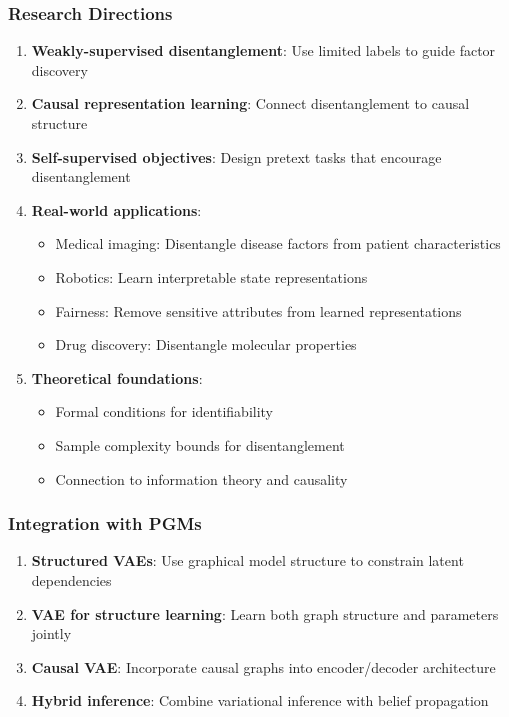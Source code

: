 \documentclass[conference]{IEEEtran}
\begin{document}
\subsubsection{Research Directions}

\begin{enumerate}
    \item \textbf{Weakly-supervised disentanglement}: Use limited labels to guide factor discovery
    
    \item \textbf{Causal representation learning}: Connect disentanglement to causal structure
    
    \item \textbf{Self-supervised objectives}: Design pretext tasks that encourage disentanglement
    
    \item \textbf{Real-world applications}:
    \begin{itemize}
        \item Medical imaging: Disentangle disease factors from patient characteristics
        \item Robotics: Learn interpretable state representations
        \item Fairness: Remove sensitive attributes from learned representations
        \item Drug discovery: Disentangle molecular properties
    \end{itemize}
    
    \item \textbf{Theoretical foundations}: 
    \begin{itemize}
        \item Formal conditions for identifiability
        \item Sample complexity bounds for disentanglement
        \item Connection to information theory and causality
    \end{itemize}
\end{enumerate}

\subsubsection{Integration with PGMs}

\begin{enumerate}
    \item \textbf{Structured VAEs}: Use graphical model structure to constrain latent dependencies
    
    \item \textbf{VAE for structure learning}: Learn both graph structure and parameters jointly
    
    \item \textbf{Causal VAE}: Incorporate causal graphs into encoder/decoder architecture
    
    \item \textbf{Hybrid inference}: Combine variational inference with belief propagation
\end{enumerate}
\end{document}
